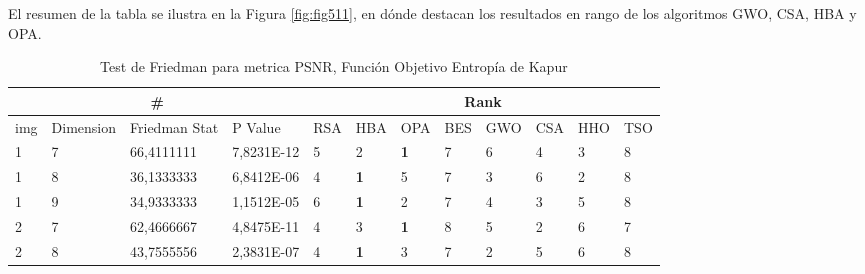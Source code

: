 \documentclass[conference]{IEEEtran}
\begin{document}
\noindent El resumen de la tabla se ilustra en la Figura \ref{fig:fig511}, en dónde destacan los resultados en rango de los algoritmos GWO, CSA, HBA y OPA.


\begin{table}[]
	\centering
	\caption{Test de Friedman para metrica PSNR, Función Objetivo Entropía de Kapur}
	\begin{tabular}{|llll|llllllll|}
		\hline
		\multicolumn{4}{|c|}{\#} & \multicolumn{8}{c|}{Rank} \\ \hline
		\multicolumn{1}{|l|}{img} & \multicolumn{1}{l|}{Dimension} & \multicolumn{1}{l|}{Friedman Stat} & P Value    & \multicolumn{1}{l|}{RSA} & \multicolumn{1}{l|}{HBA}        & \multicolumn{1}{l|}{OPA}        & \multicolumn{1}{l|}{BES} & \multicolumn{1}{l|}{GWO}        & \multicolumn{1}{l|}{CSA}        & \multicolumn{1}{l|}{HHO}        & TSO                    \\ \hline 
		\multicolumn{1}{|l|}{1}   & \multicolumn{1}{l|}{7}         & \multicolumn{1}{l|}{66,4111111}    & 7,8231E-12 & \multicolumn{1}{l|}{5}   & \multicolumn{1}{l|}{2}          & \multicolumn{1}{l|}{\textbf{1}} & \multicolumn{1}{l|}{7}   & \multicolumn{1}{l|}{6}          & \multicolumn{1}{l|}{4}          & \multicolumn{1}{l|}{3}          & 8                      \\ \hline
		\multicolumn{1}{|l|}{1}   & \multicolumn{1}{l|}{8}         & \multicolumn{1}{l|}{36,1333333}    & 6,8412E-06 & \multicolumn{1}{l|}{4}   & \multicolumn{1}{l|}{\textbf{1}} & \multicolumn{1}{l|}{5}          & \multicolumn{1}{l|}{7}   & \multicolumn{1}{l|}{3}          & \multicolumn{1}{l|}{6}          & \multicolumn{1}{l|}{2}          & 8                      \\ \hline
		\multicolumn{1}{|l|}{1}   & \multicolumn{1}{l|}{9}         & \multicolumn{1}{l|}{34,9333333}    & 1,1512E-05 & \multicolumn{1}{l|}{6}   & \multicolumn{1}{l|}{\textbf{1}} & \multicolumn{1}{l|}{2}          & \multicolumn{1}{l|}{7}   & \multicolumn{1}{l|}{4}          & \multicolumn{1}{l|}{3}          & \multicolumn{1}{l|}{5}          & 8                      \\ \hline
		\multicolumn{1}{|l|}{2}   & \multicolumn{1}{l|}{7}         & \multicolumn{1}{l|}{62,4666667}    & 4,8475E-11 & \multicolumn{1}{l|}{4}   & \multicolumn{1}{l|}{3}          & \multicolumn{1}{l|}{\textbf{1}} & \multicolumn{1}{l|}{8}   & \multicolumn{1}{l|}{5}          & \multicolumn{1}{l|}{2}          & \multicolumn{1}{l|}{6}          & 7                      \\ \hline
		\multicolumn{1}{|l|}{2}   & \multicolumn{1}{l|}{8}         & \multicolumn{1}{l|}{43,7555556}    & 2,3831E-07 & \multicolumn{1}{l|}{4}   & \multicolumn{1}{l|}{\textbf{1}} & \multicolumn{1}{l|}{3}          & \multicolumn{1}{l|}{7}   & \multicolumn{1}{l|}{2}          & \multicolumn{1}{l|}{5}          & \multicolumn{1}{l|}{6}          & 8                      \\ \hline

\end{tabular}
\end{table}
\end{document}
